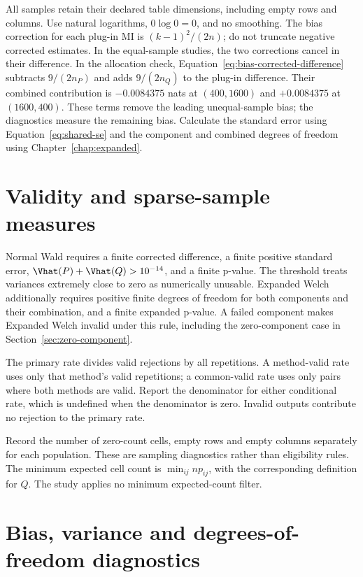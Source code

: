 All samples retain their declared table dimensions, including empty rows
and columns. Use natural logarithms, \(0\log0=0\), and no smoothing.
The bias correction for each plug-in MI is \((k-1)^2/(2n)\); do not truncate
negative corrected estimates. In the equal-sample studies, the two
corrections cancel in their difference. In the allocation check,
Equation~\eqref{eq:bias-corrected-difference} subtracts
\(9/(2n_P)\) and adds \(9/(2n_Q)\) to the plug-in difference.
Their combined contribution is \(-0.0084375\) nats at \((400,1600)\)
and \(+0.0084375\) at \((1600,400)\). These terms remove the leading
unequal-sample bias; the diagnostics measure the remaining bias.
Calculate the standard error using
Equation~\eqref{eq:shared-se} and the component and combined degrees of freedom
using Chapter~\ref{chap:expanded}.

\section{Validity and sparse-sample measures}
\label{sec:validity-rules}

Normal Wald requires a finite corrected difference, a finite positive
standard error, \(\Vhat(P)+\Vhat(Q)>10^{-14}\), and a finite p-value.
The threshold treats variances extremely close to zero as numerically
unusable. Expanded Welch additionally requires positive finite degrees
of freedom for both components and their combination, and a finite
expanded p-value. A failed component makes Expanded Welch invalid under
this rule, including the zero-component case in
Section~\ref{sec:zero-component}.

The primary rate divides valid rejections by all repetitions. A
method-valid rate uses only that method's valid repetitions; a
common-valid rate uses only pairs where both methods are valid. Report
the denominator for either conditional rate, which is undefined when
the denominator is zero. Invalid outputs contribute no rejection to
the primary rate.

Record the number of zero-count cells, empty rows and empty columns
separately for each population. These are sampling diagnostics rather
than eligibility rules. The minimum expected cell count is
\(\min_{ij}np_{ij}\), with the corresponding definition for \(Q\).
The study applies no minimum expected-count filter.

\section{Bias, variance and degrees-of-freedom diagnostics}

